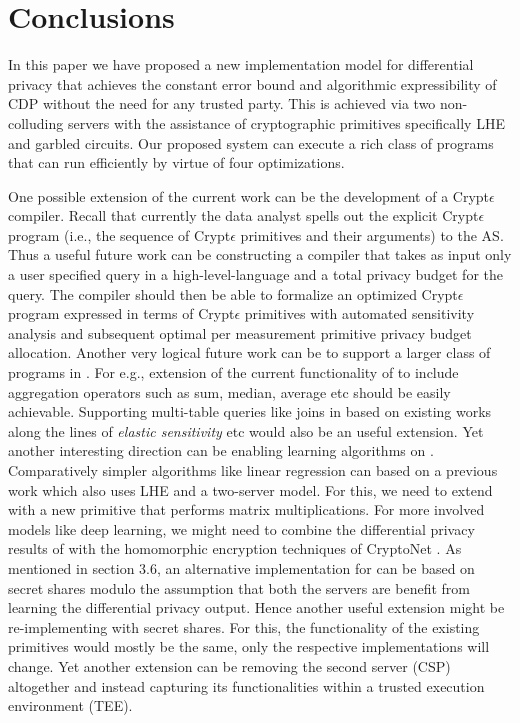 
\section{Conclusions}\label{sec:conclusions}
In this paper we have proposed a new implementation model for differential privacy that achieves the constant error bound and  algorithmic expressibility of \textsf{CDP} without the need for any trusted party. This is achieved via two non-colluding servers with the assistance of cryptographic primitives specifically \textsf{LHE} and garbled circuits. Our proposed system \system can execute a rich class of programs that can run  efficiently by virtue of four optimizations.
\par  One possible extension of the current work can be the development of a
Crypt$\epsilon$ compiler. Recall that currently the data analyst spells out the explicit Crypt$\epsilon$ program  (i.e., the sequence of Crypt$\epsilon$ primitives and their arguments) to the \textsf{AS}. Thus a useful future work can be constructing a compiler that takes as input only a user specified query in a high-level-language and a total privacy budget for the query. The
compiler should then be able to formalize an optimized Crypt$\epsilon$ program expressed in terms of Crypt$\epsilon$ primitives with automated sensitivity analysis and subsequent optimal per measurement primitive privacy budget allocation. 
Another very logical future work can be to support a larger class of programs in \system. For e.g., extension of the current functionality of \system to include aggregation operators such as sum, median, average etc should be easily achievable. Supporting  multi-table queries like joins in \system based on existing works along the lines of \emph{elastic sensitivity} \cite{elastic} etc would also be an useful extension.  Yet another interesting direction can be enabling learning algorithms on \system.   Comparatively simpler algorithms like linear regression can based on a previous work \cite{LReg} which also uses \textsf{LHE} and a two-server model. For this, we need to extend \system with a new primitive that performs matrix multiplications. For more involved models like deep learning, we might need to combine the differential privacy results of \cite{DLDP} with the homomorphic encryption techniques of  CryptoNet \cite{CryptoNet}. As mentioned in section 3.6, an alternative implementation for \system  can be based on secret shares modulo the assumption that both the servers are benefit from learning the differential privacy output. Hence another useful extension might be re-implementing \system with  secret shares. For this, the functionality of the existing primitives would mostly be the same, only the respective implementations will change. 
Yet another extension can be removing the second server (\textsf{CSP}) altogether and instead capturing its functionalities within a trusted execution environment (TEE).
